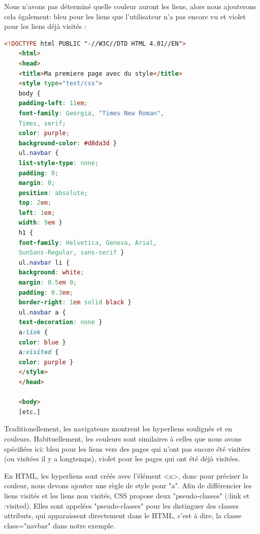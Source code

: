 Nous n'avons pas déterminé quelle couleur auront les liens, alors nous ajouterons cela également: bleu pour les liens que l'utilisateur n'a pas encore vu et violet pour les liens déjà visités : 
\begin{lstlisting}[language=html]
	<!DOCTYPE html PUBLIC "-//W3C//DTD HTML 4.01//EN">
	<html>
	<head>
	<title>Ma premiere page avec du style</title>
	<style type="text/css">
	body {
	padding-left: 11em;
	font-family: Georgia, "Times New Roman",
	Times, serif;
	color: purple;
	background-color: #d8da3d }
	ul.navbar {
	list-style-type: none;
	padding: 0;
	margin: 0;
	position: absolute;
	top: 2em;
	left: 1em;
	width: 9em }
	h1 {
	font-family: Helvetica, Geneva, Arial,
	SunSans-Regular, sans-serif }
	ul.navbar li {
	background: white;
	margin: 0.5em 0;
	padding: 0.3em;
	border-right: 1em solid black }
	ul.navbar a {
	text-decoration: none }
	a:link {
	color: blue }
	a:visited {
	color: purple }
	</style>
	</head>
	
	<body>
	[etc.]
\end{lstlisting}
Traditionellement, les navigateurs montrent les hyperliens soulignés et en couleurs. Habituellement, les couleurs sont similaires à celles que nous avons spécifiées ici: bleu pour les liens vers des pages qui n'ont pas encore été visitées (ou visitées il y a longtemps), violet pour les pages qui ont été déjà visitées.

En HTML, les hyperliens sont créés avec l'élément <a>, donc pour préciser la couleur, nous devons ajouter une règle de style pour "a". Afin de différencier les liens visités et les liens non visités, CSS propose deux "pseudo-classes" (:link et :visited). Elles sont appelées "pseudo-classes" pour les distinguer des classes attributs, qui apparaissent directement dans le HTML, c'est à dire, la classe class="navbar" dans notre exemple. 
\normalsize
